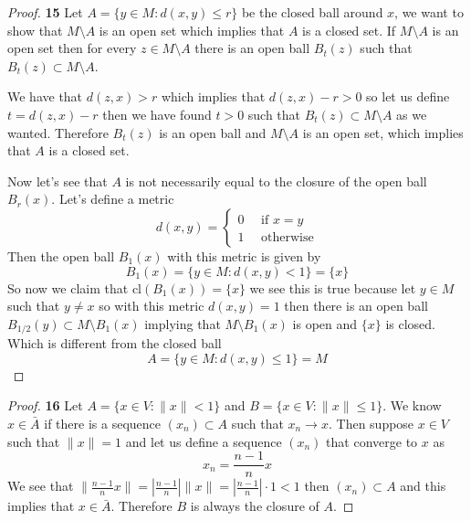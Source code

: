 \documentclass[11pt]{article}
\newcommand{\cl}{\text{cl}}
\theoremstyle{definition}
\begin{document}
	\begin{proof}{\textbf{15}}
        Let $A = \{y \in M: d(x,y) \leq r\}$ be the closed ball around $x$, we want
        to show that $M \setminus A$ is an open set which implies that $A$ is
        a closed set.
        If $M \setminus A$ is an open set then for every $z \in M \setminus A$
        there is an open ball $B_t(z)$ such that $B_t(z) \subset M \setminus A$.
        
        We have that $d(z,x) > r$ which implies that $d(z,x) - r > 0$ so let us
        define $t = d(z,x) - r$ then we have found $t > 0$ such that
        $B_t(z) \subset M \setminus A$ as we wanted.
        Therefore $B_t(z)$ is an open ball and $M \setminus A$ is
        an open set, which implies that $A$ is a closed set.

        Now let's see that $A$ is not necessarily equal to the closure of the open ball
        $B_r(x)$. Let's define a metric
        $$d(x,y) = \begin{cases}
            \text{$0 \quad$ if $x = y$}\\
            \text{$1 \quad$ otherwise}
        \end{cases}$$
        Then the open ball $B_{1}(x)$ with this metric is given by
        $$B_1(x) = \{y \in M: d(x,y) < 1\} = \{x\}$$
        So now we claim that $\cl(B_1(x)) = \{x\}$ we see this is true because let
        $y\in M$ such that $y \neq x$ so with this metric $d(x,y) = 1$ then there is an
        open ball $B_{1/2}(y) \subset M \setminus B_1(x)$ implying that $M \setminus B_1(x)$
        is open and $\{x\}$ is closed. Which is different from the closed ball
        $$A = \{y \in M: d(x,y) \leq 1\} = M$$
    \end{proof}
	\begin{proof}{\textbf{16}}
        Let $A = \{x \in V: \|x\| < 1\}$ and $B = \{x \in V: \|x\| \leq 1\}$. We
        know $x \in \bar{A}$ if there is a sequence $(x_n) \subset A$ such that
        $x_n \to x$. Then suppose $x \in V$ such that $\|x\| = 1$ and let us define a
        sequence $(x_n)$ that converge to $x$ as
        $$x_n = \frac{n-1}{n}x$$
        We see that $\|\frac{n-1}{n}x\| = |\frac{n-1}{n}|\|x\| = |\frac{n-1}{n}|\cdot 1 < 1$
        then $(x_n) \subset A$ and this implies that $x \in \bar{A}$. Therefore
        $B$ is always the closure of $A$.
    \end{proof}
\end{document}
